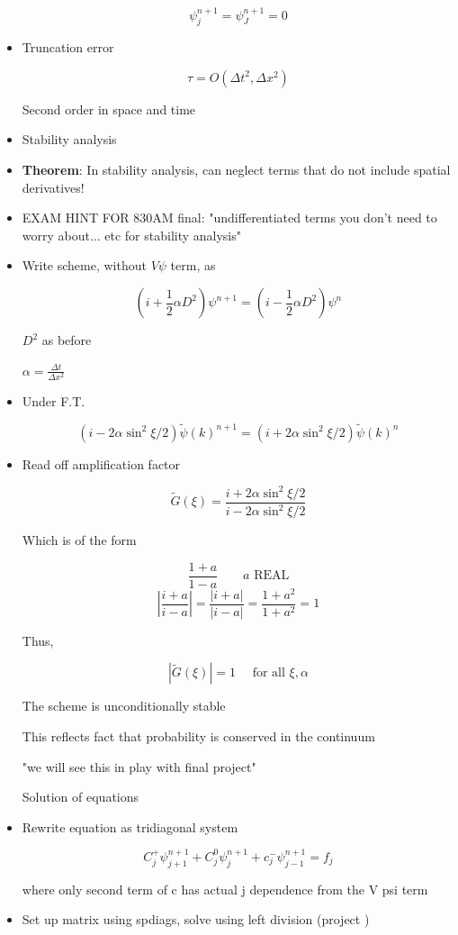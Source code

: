 \begin{itemize}
    \[ \psi^{n+1}_j = \psi^{n+1}_J = 0\]

    \item Truncation error 

    \[ \tau = O(\Delta t^2, \Delta x^2)\]

    Second order in space and time

    \item Stability analysis

    \item \textbf{Theorem}: In stability analysis, can neglect terms that do not include spatial derivatives!

    \item EXAM HINT FOR 830AM final: "undifferentiated terms you don't need to worry about... etc for stability analysis"

    \item Write scheme, without $V \psi$ term, as 

    \[ (i + \frac{1}{2} \alpha D^2) \psi^{n+1} = (i-\frac{1}{2} \alpha D^2) \psi^n\]

    $D^2 $ as before \newline

    $\alpha = \frac{\Delta t}{\Delta x^2}$

    \item Under F.T.

    \[ (i- 2 \alpha \sin^2 \xi/2 ) \tilde{\psi}(k)^{n+1} = (i+2\alpha \sin^2 \xi/2) \tilde{\psi}(k)^n\]
    

    \item Read off amplification factor 

    \[ \tilde{G}(\xi) = \frac{i+2\alpha \sin^2 \xi/2 }{i-2\alpha \sin^2 \xi/2}\]

    Which is of the form

    \[ \frac{1+a}{1-a} \qquad a \text{ REAL}\]
    \[ \left| \frac{i+a}{i-a} \right| = \frac{|i+a|}{|i-a|} = \frac{1+a^2}{1+a^2} = 1\]

    Thus,

    \[ |\tilde{G}(\xi)| = 1 \quad \text{ for all } \xi, \alpha\]

    The scheme is unconditionally stable

    This reflects fact that probability is conserved in the continuum

    "we will see this in play with final project"

    Solution of equations

    \item Rewrite equation as tridiagonal system

    \[ C^+_j \psi_{j+1}^{n+1} + C_j^0 \psi _j^{n+1} + c_j^- \psi_{j-1}^{n+1} = f_j\]

    where only second term of c has actual j dependence from the V psi term

    \item Set up matrix using spdiags, solve using left division (project )
\end{itemize}

